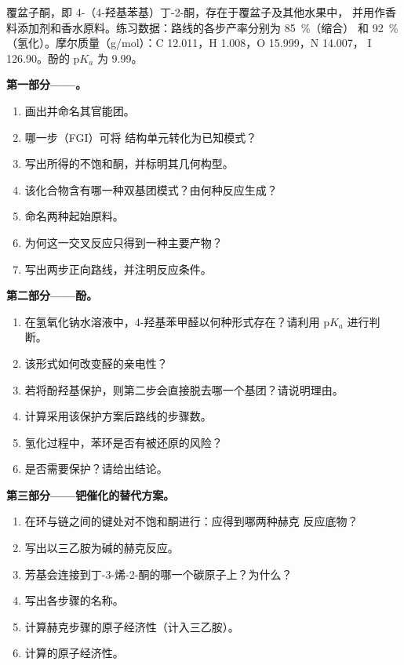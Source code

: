 \begin{problem}
\label{pb:b2:retrosynthesis:1}
覆盆子酮，即 4-（4-羟基苯基）丁-2-酮，存在于覆盆子及其他水果中，
并用作香料添加剂和香水原料。练习数据：路线的各步产率分别为 85~\%（缩合）
和 92~\%（氢化）。摩尔质量（\unit{g/mol}）：C 12.011，H 1.008，O 15.999，N 14.007，
I 126.90。酚的 $\mathrm pK_a$ 为 9.99。

\medskip
\noindent\textbf{第一部分——。}
\begin{enumerate}
  \item 画出并命名其官能团。
  \item 哪一步（FGI）可将  结构单元转化为已知模式？
  \item 写出所得的不饱和酮，并标明其几何构型。
  \item 该化合物含有哪一种双基团模式？由何种反应生成？
  \item 命名两种起始原料。
  \item 为何这一交叉反应只得到一种主要产物？
  \item 写出两步正向路线，并注明反应条件。
\end{enumerate}

\medskip
\noindent\textbf{第二部分——酚。}
\begin{enumerate}[resume]
  \item 在氢氧化钠水溶液中，4-羟基苯甲醛以何种形式存在？请利用
        $\mathrm pK_a$ 进行判断。
  \item 该形式如何改变醛的亲电性？
  \item 若将酚羟基保护，则第二步会直接脱去哪一个基团？请说明理由。
  \item 计算采用该保护方案后路线的步骤数。
  \item 氢化过程中，苯环是否有被还原的风险？
  \item 是否需要保护？请给出结论。
\end{enumerate}

\medskip
\noindent\textbf{第三部分——钯催化的替代方案。}
\begin{enumerate}[resume]
  \item 在环与链之间的键处对不饱和酮进行：应得到哪两种赫克
        反应底物？
  \item 写出以三乙胺为碱的赫克反应。
  \item 芳基会连接到丁-3-烯-2-酮的哪一个碳原子上？为什么？
  \item 写出各步骤的名称。
  \item 计算赫克步骤的原子经济性（计入三乙胺）。
  \item 计算的原子经济性。
\end{enumerate}


\end{problem}
